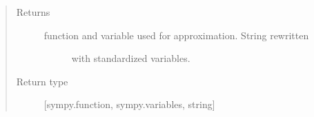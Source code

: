 \documentclass[letterpaper,10pt,english]{sphinxmanual}
\begin{document}
\begin{fulllineitems}
\begin{quote}
\begin{description}
\begin{itemize}
\end{itemize}

\item[{Returns}] \leavevmode
\begin{description}
\item[{function and variable used for approximation. String rewritten}] \leavevmode
with standardized variables.

\end{description}


\item[{Return type}] \leavevmode
{[}sympy.function, sympy.variables, string{]}

\end{description}\end{quote}

\end{fulllineitems}

\end{document}
